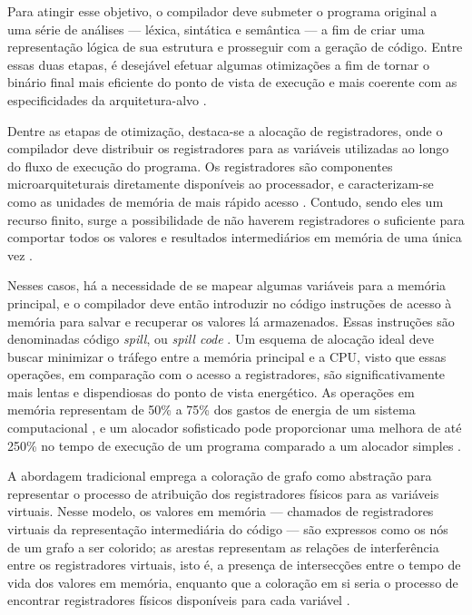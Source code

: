 \documentclass[
	12pt,				%
	openright,			%
	oneside,			%
	a4paper,			%
	tccpreliminar,			%
	]{ABNT-DC-UEL}
\begin{document}
Para atingir esse objetivo, o compilador deve submeter o programa original a uma série de análises --- léxica, sintática e semântica --- a fim de criar uma representação lógica de sua estrutura e prosseguir com a geração de código. Entre essas duas etapas, é desejável efetuar algumas otimizações a fim de tornar o binário final mais eficiente do ponto de vista de execução e mais coerente com as especificidades da arquitetura-alvo \cite{muchnick:97}.

Dentre as etapas de otimização, destaca-se a alocação de registradores, onde o compilador deve distribuir os registradores para as variáveis utilizadas ao longo do fluxo de execução do programa. Os registradores são componentes microarquiteturais diretamente disponíveis ao processador, e caracterizam-se como as unidades de memória de mais rápido acesso \cite{mittal:16}. Contudo, sendo eles um recurso finito, surge a possibilidade de não haverem registradores o suficiente para comportar todos os valores e resultados intermediários em memória de uma única vez \cite{aho:07}.

Nesses casos, há a necessidade de se mapear algumas variáveis para a memória principal, e o compilador deve então introduzir no código instruções de acesso à memória para salvar e recuperar os valores lá armazenados. Essas instruções são denominadas código \textit{spill}, ou \textit{spill code} \cite{briggs:92}. Um esquema de alocação ideal deve buscar minimizar o tráfego entre a memória principal e a CPU, visto que essas operações, em comparação com o acesso a registradores, são significativamente mais lentas e dispendiosas do ponto de vista energético. As operações em memória representam de 50\% a 75\% dos gastos de energia de um sistema computacional \cite{verma:06}, e um alocador sofisticado pode proporcionar uma melhora de até 250\% no tempo de execução de um programa comparado a um alocador simples \cite{pereira:08}.

A abordagem tradicional emprega a coloração de grafo como abstração para representar o processo de atribuição dos registradores físicos para as variáveis virtuais. Nesse modelo, os valores em memória --- chamados de registradores virtuais da representação intermediária do código --- são expressos como os nós de um grafo a ser colorido; as arestas representam as relações de interferência entre os registradores virtuais, isto é, a presença de intersecções entre o tempo de vida dos valores em memória, enquanto que a coloração em si seria o processo de encontrar registradores físicos disponíveis para cada variável \cite{chaitin:81}.
\end{document}
